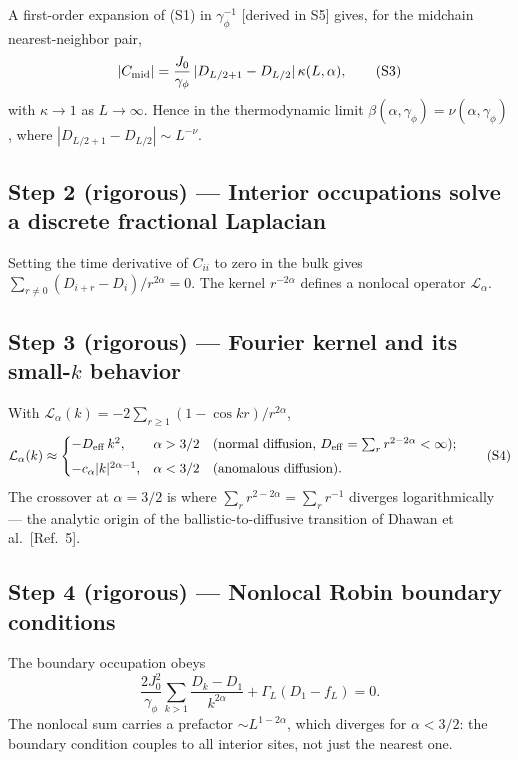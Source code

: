 \documentclass[aps,prb,twocolumn,superscriptaddress]{revtex4-2}
\begin{document}
A first-order expansion of (S1) in $\gamma_\phi^{-1}$ [derived in S5] gives, for the midchain nearest-neighbor pair,
\begin{equation}
|C_{\rm mid}| = \frac{J_0}{\gamma_\phi}\,|D_{L/2+1} - D_{L/2}|\,\kappa(L,\alpha),
\tag{S3}
\end{equation}
with $\kappa \to 1$ as $L \to \infty$. Hence in the thermodynamic limit $\beta(\alpha,\gamma_\phi) = \nu(\alpha,\gamma_\phi)$, where $|D_{L/2+1} - D_{L/2}| \sim L^{-\nu}$.

\subsection*{Step 2 (rigorous) --- Interior occupations solve a discrete fractional Laplacian}

Setting the time derivative of $C_{ii}$ to zero in the bulk gives $\sum_{r\neq 0}(D_{i+r} - D_i)/r^{2\alpha} = 0$. The kernel $r^{-2\alpha}$ defines a nonlocal operator $\mathcal{L}_\alpha$.

\subsection*{Step 3 (rigorous) --- Fourier kernel and its small-$k$ behavior}

With $\mathcal{L}_\alpha(k) = -2\sum_{r\geq 1}(1 - \cos kr)/r^{2\alpha}$,
\begin{equation}
\mathcal{L}_\alpha(k) \approx
\begin{cases}
-D_{\rm eff}\,k^2, & \alpha > 3/2 \quad\text{(normal diffusion, $D_{\rm eff} = \sum_r r^{2-2\alpha} < \infty$)}; \\[4pt]
-c_\alpha|k|^{2\alpha-1}, & \alpha < 3/2 \quad\text{(anomalous diffusion)}.
\end{cases}
\tag{S4}
\end{equation}
The crossover at $\alpha = 3/2$ is where $\sum_r r^{2-2\alpha} = \sum_r r^{-1}$ diverges logarithmically --- the analytic origin of the ballistic-to-diffusive transition of Dhawan et al.~[Ref.~5].

\subsection*{Step 4 (rigorous) --- Nonlocal Robin boundary conditions}

The boundary occupation obeys
\begin{equation}
\frac{2J_0^2}{\gamma_\phi}\sum_{k>1}\frac{D_k - D_1}{k^{2\alpha}} + \Gamma_L(D_1 - f_L) = 0.
\tag{S5}
\end{equation}
The nonlocal sum carries a prefactor $\sim L^{1-2\alpha}$, which diverges for $\alpha < 3/2$: the boundary condition couples to all interior sites, not just the nearest one.
\end{document}
